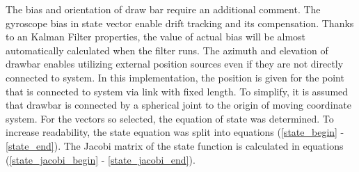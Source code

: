 The bias and orientation of draw bar require an additional comment. The gyroscope bias in state vector enable drift tracking and its compensation. Thanks to an Kalman Filter properties, the value of actual bias will be almost automatically calculated when the filter runs. The azimuth and elevation of drawbar enables utilizing external position sources even if they are not directly connected to system. In this implementation, the position is given for the point that is connected to system via link with fixed length. To simplify, it is assumed that drawbar is connected by a spherical joint to the origin of moving coordinate system. For the vectors so selected, the equation of state was determined. To increase readability, the state equation was split into equations (\ref{state_begin} - \ref{state_end}). The Jacobi matrix of the state function is calculated in equations (\ref{state_jacobi_begin} - \ref{state_jacobi_end}).

